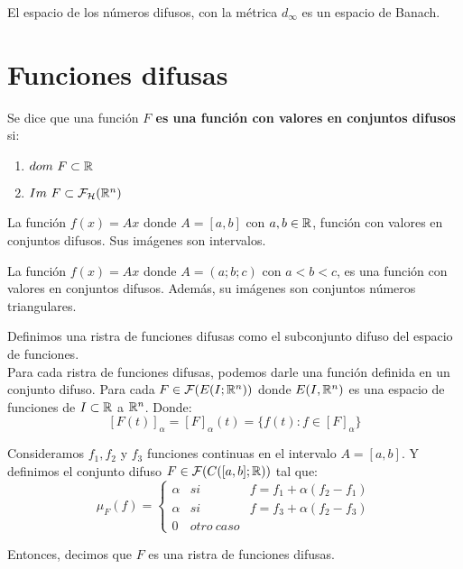   \begin{teorema}
    \label{teorema:banach}
    El espacio de los números difusos, con la métrica $d_\infty$ es un espacio de Banach.
  \end{teorema}

  \section{Funciones difusas}
  \begin{definicion}
    \label{def:fizzusetvaluedfunc} Se dice que una función \textbf{$F$ es una función con valores en conjuntos difusos} si:
    \begin{enumerate}
    \item $dom ~ F \subset \mathbb R$
    \item $Im ~ F \subset \mathcal{F}_\mathcal{H}(\mathbb R^n)$
    \end{enumerate}
  \end{definicion}

  \begin{ejemplo}
    La función $f(x) = A x$ donde $A=[a, b]$ con $a, b \in \mathbb R$, función con valores en conjuntos difusos. Sus imágenes son intervalos.
  \end{ejemplo}

  \begin{ejemplo}
    La función $f(x) = A x$ donde $A=(a;b;c)$ con $a<b<c$, es una función con valores en conjuntos difusos. Además, su imágenes son conjuntos números triangulares.
  \end{ejemplo}

  \iffalse
  \begin{definicion}
    Definimos una ristra de funciones difusas como el subconjunto difuso del espacio de funciones. \\
    Para cada ristra de funciones difusas, podemos darle una función definida en un conjunto difuso. Para cada $F \in \mathcal{F}(E(I; \mathbb R^n))$ donde $E(I, \mathbb R^n)$ es una espacio de funciones de $I \subset \mathbb R$ a $\mathbb R^n$. Donde:
    \[
      [F(t)]_\alpha = [F]_\alpha(t) = \{f(t) : f \in [F]_\alpha\}
      \]
  \end{definicion}

  \begin{ejemplo}
    Consideramos $f_1, f_2$ y $f_3$ funciones continuas en el intervalo $A=[a, b]$. Y definimos el conjunto difuso $F \in \mathcal{F}(C([a, b]; \mathbb R))$ tal que:
    \[
    \mu_F(f) = \left\{
    \begin{array}{ccc}
      \alpha & si & f = f_1 + \alpha(f_2 - f_1) \\
      \alpha & si & f = f_3 + \alpha(f_2 - f_3) \\
      0 & otro~caso & 
    \end{array}
    \right.
    \]
    
    Entonces, decimos que $F$ es una ristra de funciones difusas.
  \end{ejemplo}

